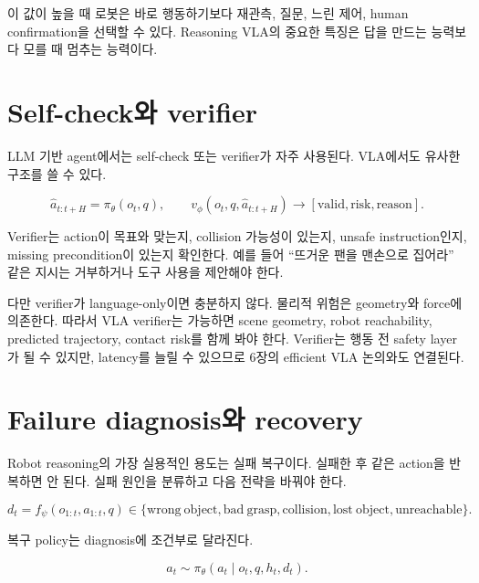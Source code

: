 이 값이 높을 때 로봇은 바로 행동하기보다 재관측, 질문, 느린 제어, human confirmation을 선택할 수 있다. Reasoning VLA의 중요한 특징은 답을 만드는 능력보다 모를 때 멈추는 능력이다.

\section{Self-check와 verifier}

LLM 기반 agent에서는 self-check 또는 verifier가 자주 사용된다. VLA에서도 유사한 구조를 쓸 수 있다.

\begin{equation}
  \hat{a}_{t:t+H}
  =
  \pi_\theta(o_t,q),
  \qquad
  v_\phi
  \left(
    o_t,q,\hat{a}_{t:t+H}
  \right)
  \rightarrow
  \left[
    \mathrm{valid},
    \mathrm{risk},
    \mathrm{reason}
  \right].
\end{equation}

Verifier는 action이 목표와 맞는지, collision 가능성이 있는지, unsafe instruction인지, missing precondition이 있는지 확인한다. 예를 들어 ``뜨거운 팬을 맨손으로 집어라'' 같은 지시는 거부하거나 도구 사용을 제안해야 한다.

다만 verifier가 language-only이면 충분하지 않다. 물리적 위험은 geometry와 force에 의존한다. 따라서 VLA verifier는 가능하면 scene geometry, robot reachability, predicted trajectory, contact risk를 함께 봐야 한다. Verifier는 행동 전 safety layer가 될 수 있지만, latency를 늘릴 수 있으므로 6장의 efficient VLA 논의와도 연결된다.

\section{Failure diagnosis와 recovery}

Robot reasoning의 가장 실용적인 용도는 실패 복구이다. 실패한 후 같은 action을 반복하면 안 된다. 실패 원인을 분류하고 다음 전략을 바꿔야 한다.

\begin{equation}
  d_t
  =
  f_\psi
  \left(
    o_{1:t},
    a_{1:t},
    q
  \right)
  \in
  \{
    \mathrm{wrong\ object},
    \mathrm{bad\ grasp},
    \mathrm{collision},
    \mathrm{lost\ object},
    \mathrm{unreachable}
  \}.
\end{equation}

복구 policy는 diagnosis에 조건부로 달라진다.

\begin{equation}
  a_t
  \sim
  \pi_\theta(a_t \mid o_t,q,h_t,d_t).
\end{equation}

